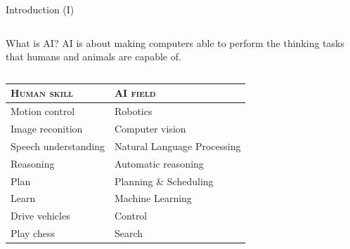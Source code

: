 \documentclass[10pt,compress]{beamer} %
\begin{document}
\begin{frame}{Introduction (I)}
    \begin{columns}
	\vspace{-0.5cm}
		\vspace{-0.5cm}
		\begin{block}{What is AI?}
		AI is about making computers able to perform the thinking tasks that humans and animals are capable of.\\
		\end{block}
	\end{columns}

		\vspace{0.25cm}

    \begin{table}
    \centering
    \begin{tabular}{l|l}
    \textsc{Human skill} & \textsc{AI field} \\\hline
    Motion control & Robotics \\
    Image reconition & Computer vision \\
    Speech understanding & Natural Language Processing \\
    Reasoning & Automatic reasoning \\
    Plan & Planning \& Scheduling \\
    Learn & Machine Learning \\
    Drive vehicles & Control \\
    Play chess & Search \\
    \end{tabular}
    \end{table}
\end{frame}
\end{document}
